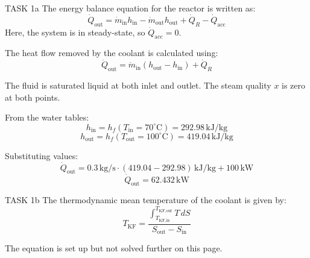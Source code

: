 TASK 1a  
The energy balance equation for the reactor is written as:  
\[
\dot{Q}_{\text{out}} = \dot{m}_{\text{in}} h_{\text{in}} - \dot{m}_{\text{out}} h_{\text{out}} + \dot{Q}_R - \dot{Q}_{\text{acc}}
\]  
Here, the system is in steady-state, so \(\dot{Q}_{\text{acc}} = 0\).  

The heat flow removed by the coolant is calculated using:  
\[
\dot{Q}_{\text{out}} = \dot{m}_{\text{in}} (h_{\text{out}} - h_{\text{in}}) + \dot{Q}_R
\]  

The fluid is saturated liquid at both inlet and outlet. The steam quality \(x\) is zero at both points.  

From the water tables:  
\[
h_{\text{in}} = h_f(T_{\text{in}} = 70^\circ\text{C}) = 292.98 \, \text{kJ/kg}
\]  
\[
h_{\text{out}} = h_f(T_{\text{out}} = 100^\circ\text{C}) = 419.04 \, \text{kJ/kg}
\]  

Substituting values:  
\[
\dot{Q}_{\text{out}} = 0.3 \, \text{kg/s} \cdot (419.04 - 292.98) \, \text{kJ/kg} + 100 \, \text{kW}
\]  
\[
\dot{Q}_{\text{out}} = 62.432 \, \text{kW}
\]  

TASK 1b  
The thermodynamic mean temperature of the coolant is given by:  
\[
T_{\text{KF}} = \frac{\int_{T_{\text{KF,in}}}^{T_{\text{KF,out}}} T \, dS}{S_{\text{out}} - S_{\text{in}}}
\]  

The equation is set up but not solved further on this page.